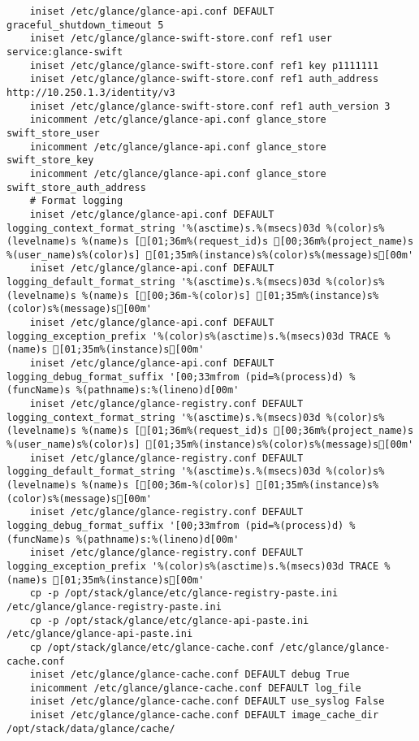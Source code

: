 \documentclass[a4paper,left=1.5cm,right=1.5cm,11pt]{article}
\begin{document}
\begin{lstlisting}
    iniset /etc/glance/glance-api.conf DEFAULT graceful_shutdown_timeout 5
	iniset /etc/glance/glance-swift-store.conf ref1 user service:glance-swift
    iniset /etc/glance/glance-swift-store.conf ref1 key p1111111
	iniset /etc/glance/glance-swift-store.conf ref1 auth_address http://10.250.1.3/identity/v3
    iniset /etc/glance/glance-swift-store.conf ref1 auth_version 3
    inicomment /etc/glance/glance-api.conf glance_store swift_store_user
    inicomment /etc/glance/glance-api.conf glance_store swift_store_key
    inicomment /etc/glance/glance-api.conf glance_store swift_store_auth_address
	# Format logging
	iniset /etc/glance/glance-api.conf DEFAULT logging_context_format_string '%(asctime)s.%(msecs)03d %(color)s%(levelname)s %(name)s [[01;36m%(request_id)s [00;36m%(project_name)s %(user_name)s%(color)s] [01;35m%(instance)s%(color)s%(message)s[00m'
    iniset /etc/glance/glance-api.conf DEFAULT logging_default_format_string '%(asctime)s.%(msecs)03d %(color)s%(levelname)s %(name)s [[00;36m-%(color)s] [01;35m%(instance)s%(color)s%(message)s[00m'
	iniset /etc/glance/glance-api.conf DEFAULT logging_exception_prefix '%(color)s%(asctime)s.%(msecs)03d TRACE %(name)s [01;35m%(instance)s[00m'
	iniset /etc/glance/glance-api.conf DEFAULT logging_debug_format_suffix '[00;33mfrom (pid=%(process)d) %(funcName)s %(pathname)s:%(lineno)d[00m'
	iniset /etc/glance/glance-registry.conf DEFAULT logging_context_format_string '%(asctime)s.%(msecs)03d %(color)s%(levelname)s %(name)s [[01;36m%(request_id)s [00;36m%(project_name)s %(user_name)s%(color)s] [01;35m%(instance)s%(color)s%(message)s[00m'
    iniset /etc/glance/glance-registry.conf DEFAULT logging_default_format_string '%(asctime)s.%(msecs)03d %(color)s%(levelname)s %(name)s [[00;36m-%(color)s] [01;35m%(instance)s%(color)s%(message)s[00m'
	iniset /etc/glance/glance-registry.conf DEFAULT logging_debug_format_suffix '[00;33mfrom (pid=%(process)d) %(funcName)s %(pathname)s:%(lineno)d[00m'
	iniset /etc/glance/glance-registry.conf DEFAULT logging_exception_prefix '%(color)s%(asctime)s.%(msecs)03d TRACE %(name)s [01;35m%(instance)s[00m'
	cp -p /opt/stack/glance/etc/glance-registry-paste.ini /etc/glance/glance-registry-paste.ini
    cp -p /opt/stack/glance/etc/glance-api-paste.ini /etc/glance/glance-api-paste.ini
    cp /opt/stack/glance/etc/glance-cache.conf /etc/glance/glance-cache.conf
    iniset /etc/glance/glance-cache.conf DEFAULT debug True
    inicomment /etc/glance/glance-cache.conf DEFAULT log_file
    iniset /etc/glance/glance-cache.conf DEFAULT use_syslog False
    iniset /etc/glance/glance-cache.conf DEFAULT image_cache_dir /opt/stack/data/glance/cache/

\end{lstlisting}
\end{document}
